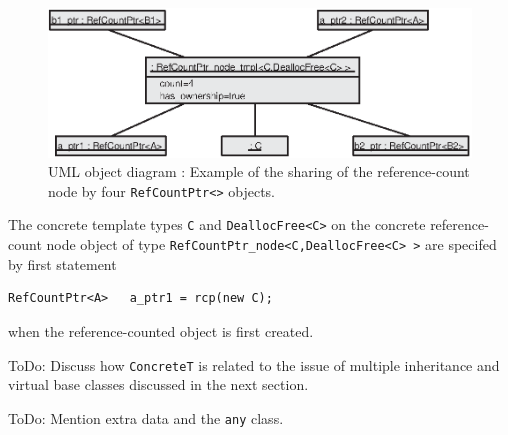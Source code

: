{\bsinglespace
\begin{figure}
\begin{center}
\includegraphics*[bb= 0.0in 0.0in 4.8in 1.8in,scale=1.0
]{RefCountPtrObjectDiagram1}
\end{center}
{}\caption{ {}\label{rcp:fig:rcp-object-diagram} UML object diagram :
Example of the sharing of the reference-count node by four
{}\texttt{RefCountPtr<>} objects.  }
\end{figure}
\esinglespace}

The concrete template types {}\texttt{C} and {}\texttt{DeallocFree<C>}
on the concrete reference-count node object of type
{}\texttt{RefCountPtr\-\_node<C,DeallocFree<C> >} are specifed by first
statement 
%
{\scriptsize\begin{verbatim}
RefCountPtr<A>   a_ptr1 = rcp(new C);
\end{verbatim}}
%
{}\noindent{}when the reference-counted object is first created.

ToDo: Discuss how \texttt{ConcreteT} is related to the issue of multiple inheritance
and virtual base classes discussed in the next section.

ToDo: Mention extra data and the \texttt{any} class.
